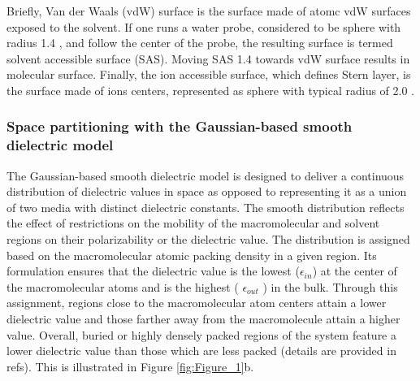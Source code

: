 \documentclass[9pt,tutorial]{livecoms}
\begin{document}
Briefly, Van der Waals (vdW) surface is the surface made of atomc vdW surfaces exposed to the solvent. If one runs a water probe, considered to be sphere with radius 1.4 \text{\AA}, and follow the center of the probe, the resulting surface is termed solvent accessible surface (SAS). Moving SAS 1.4 \text{\AA} towards vdW surface results in molecular surface. Finally, the ion accessible surface, which defines Stern layer, is the surface made of ions centers, represented as sphere with typical radius of 2.0 \text{\AA}.

\subsubsection{Space partitioning with the Gaussian-based smooth dielectric model}
The Gaussian-based smooth dielectric model is designed to deliver a continuous distribution of dielectric values in space as opposed to representing it as a union of two media with distinct dielectric constants. 
The smooth distribution reflects the effect of restrictions on the mobility of the macromolecular and solvent regions on their polarizability or the dielectric value. The distribution is assigned based on the macromolecular atomic packing density in a given region. Its formulation ensures that the dielectric value is the lowest ($ \epsilon_{in} $) at the center of the macromolecular atoms and is the highest ( $ \epsilon_{out} $ ) in the bulk. Through this assignment, regions close to the macromolecular atom centers attain a lower dielectric value and those farther away from the macromolecule attain a higher value. Overall, buried or highly densely packed regions of the system feature a lower dielectric value than those which are less packed (details are provided in refs\cite{chakravorty2019grid,decherchi2013between}). This is illustrated in Figure \ref{fig:Figure_1}b.
\end{document}
